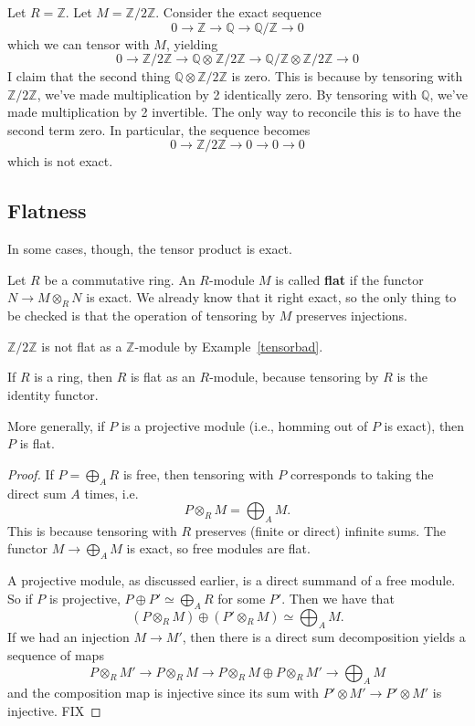\begin{example} \label{tensorbad}
Let $R = \mathbb{Z}$. Let $M = \mathbb{Z}/2\mathbb{Z}$. Consider the exact
sequence
\[ 0 \to \mathbb{Z} \to \mathbb{Q} \to \mathbb{Q}/\mathbb{Z} \to 0  \]
which we can tensor with $M$, yielding
\[ 0 \to \mathbb{Z}/2\mathbb{Z} \to \mathbb{Q} \otimes_{}
\mathbb{Z}/2\mathbb{Z} \to  \mathbb{Q}/\mathbb{Z} \otimes
\mathbb{Z}/2\mathbb{Z} \to 0  \]
I claim that the second thing $\mathbb{Q} \otimes \mathbb{Z}/2\mathbb{Z}$ is zero.  This is because by tensoring with
$\mathbb{Z}/2\mathbb{Z}$, we've made multiplication by 2 identically zero. By
tensoring with $\mathbb{Q}$, we've made multiplication by 2 invertible. The
only way to reconcile this is to have the second term zero. In particular, the
sequence becomes
\[ 0 \to \mathbb{Z}/2\mathbb{Z} \to 0 \to 0 \to 0  \]
which is not exact. 
\end{example} 


\subsection{Flatness}
In some cases, though, the tensor product is exact.

\begin{definition} 
Let $R$ be a commutative ring. An $R$-module $M$ is called \textbf{flat} if the
functor $N \to M \otimes_R N$ is exact. We already know that it right exact,
so the only thing to be checked is that the operation of  tensoring by $M$ preserves injections. 
\end{definition} 

\begin{example} 
$\mathbb{Z}/2\mathbb{Z}$ is not flat as a $\mathbb{Z}$-module by
Example~\ref{tensorbad}.

\end{example} 

\begin{example} 
If $R$ is a ring, then $R$ is flat as an $R$-module, because tensoring by $R$
is the identity functor. 

More generally, if $P$ is a projective module (i.e., homming out of $P$ is exact), then $P$ is flat. 
\end{example} 
\begin{proof} 
If $P  = \bigoplus_A R$ is free, then tensoring with $P$ corresponds to taking
the direct sum $A$ times, i.e.
\[ P \otimes_R M = \bigoplus_A M.  \]
This is because tensoring with $R$ preserves (finite or direct) infinite sums.
 The functor $M \to \bigoplus_A M$ is exact, so free
modules are flat.

A projective module, as discussed earlier, is a direct summand of a free
module. So if $P$ is projective, $P \oplus P' \simeq \bigoplus_A R$ for some
$P'$. Then we have that
\[ (P \otimes_R M) \oplus (P' \otimes_R M) \simeq \bigoplus_A M.  \]
If we had an injection $M \to M'$, then there is a direct sum decomposition
yields a sequence of  maps
\[ P \otimes_R M' \to P \otimes_R M \to P \otimes_R M \oplus P \otimes_R M'
\to \bigoplus_A M  \]
and the composition map is injective since its sum with $P' \otimes
M' \to P' \otimes M'$ is injective.  FIX \end{proof} 



